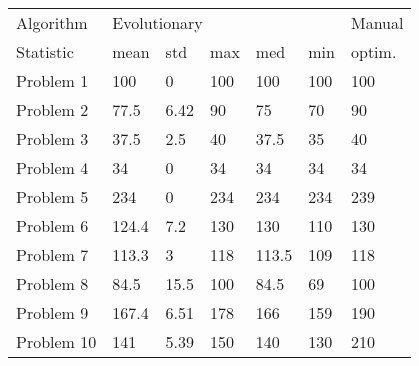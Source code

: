 \begin{tabular}{lllllll}
\toprule
Algorithm & \multicolumn{5}{l}{Evolutionary} & Manual \\
Statistic &         mean &   std &  max &    med &  min & optim. \\
\midrule
Problem 1  &          100 &     0 &  100 &    100 &  100 &    100 \\
Problem 2  &         77.5 &  6.42 &   90 &     75 &   70 &     90 \\
Problem 3  &         37.5 &   2.5 &   40 &   37.5 &   35 &     40 \\
Problem 4  &           34 &     0 &   34 &     34 &   34 &     34 \\
Problem 5  &          234 &     0 &  234 &    234 &  234 &    239 \\
Problem 6  &        124.4 &   7.2 &  130 &    130 &  110 &    130 \\
Problem 7  &        113.3 &     3 &  118 &  113.5 &  109 &    118 \\
Problem 8  &         84.5 &  15.5 &  100 &   84.5 &   69 &    100 \\
Problem 9  &        167.4 &  6.51 &  178 &    166 &  159 &    190 \\
Problem 10 &          141 &  5.39 &  150 &    140 &  130 &    210 \\
\bottomrule
\end{tabular}
